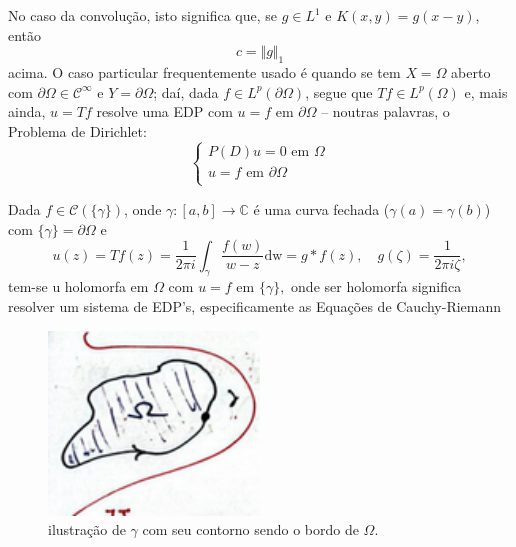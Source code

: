 \documentclass[../distribution_theory_notes.tex]{subfiles}
\begin{document}
No caso da convolução, isto significa que, se \(g\in L^{1}\) e \(K(x, y) = g(x-y)\), então
\[
	c = \Vert g \Vert_{1}
\]
acima. O caso particular frequentemente usado é quando se tem \(X = \Omega \) aberto com \(\partial \Omega \in \mathcal{C}^{\infty}\) e \(Y = \partial \Omega \); daí, dada \(f\in L^{p}(\partial \Omega )\), segue que \(Tf\in L^{p}(\Omega )\) e, mais ainda, \(u=Tf\) resolve uma EDP com \(u=f\) em \(\partial \Omega \) -- noutras palavras, o Problema de Dirichlet:
\[
	\left\{\begin{array}{ll}
		P(D)u = 0 \text{ em }\Omega      \\
		u = f \text{ em }\partial \Omega \\
	\end{array}\right.
\]
\begin{example}
	Dada \(f\in \mathcal{C}(\{\gamma \})\), onde \(\gamma :[a, b]\rightarrow \mathbb{C}\) é uma curva fechada (\(\gamma (a) = \gamma (b)\)) com \(\{\gamma \}=\partial \Omega \) e
	\[
		u(z) = Tf(z) = \frac{1}{2\pi i}\int_{\gamma }^{}\frac{f(w)}{w-z} \mathrm{dw} = g*f(z),\quad g(\zeta ) = \frac{1}{2\pi i \zeta },
	\]
	tem-se u holomorfa em \(\Omega \) com \(u = f\) em \(\{\gamma \},\) onde ser holomorfa significa resolver um sistema de EDP's, especificamente as Equações de Cauchy-Riemann
	\begin{figure}[H]
		\begin{center}
			\includegraphics[height=0.5\textheight, width=0.5\textwidth, keepaspectratio]{./Images/closed_path_09.png}
		\end{center}
		\caption{ilustração de \(\gamma \) com seu contorno sendo o bordo de \(\Omega \).}
	\end{figure}
\end{example}
\end{document}
